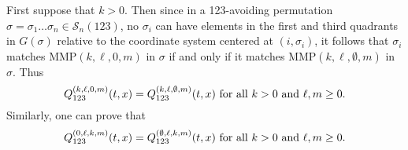 \documentclass[
final,nomarks
]{dmtcs-episciences}
\newcommand{\Sn}[1]{\mathcal{S}_{#1}}
\newcommand{\Qm}[1]{Q_{123}^{(#1)}(t,x)}
\newcommand{\MMP}{\mathrm{MMP}}
\begin{document}
First suppose that \begin{math}k >0\end{math}.  Then since in a 123-avoiding permutation 
\begin{math}\sigma = \sigma_1 \ldots \sigma_n \in \Sn{n}(123)\end{math}, no \begin{math}\sigma_i\end{math} can have elements 
in the first and third quadrants in \begin{math}G(\sigma)\end{math} relative to the coordinate system 
centered at \begin{math}(i,\sigma_i)\end{math}, it follows that \begin{math}\sigma_i\end{math} matches 
\begin{math}\MMP(k,\ell,0,m)\end{math} in \begin{math}\sigma\end{math} if and only if it matches \begin{math}\MMP(k,\ell,\emptyset,m)\end{math} in \begin{math}\sigma\end{math}. 
Thus 
\begin{equation}
\Qm{k,\ell,0,m}=\Qm{k,\ell,\emptyset,m} \ \mbox{for all \begin{math}k > 0\end{math} and \begin{math}\ell,m \geq 0\end{math}.}
\end{equation}
Similarly, one can prove that 
\begin{equation}
\Qm{0,\ell,k,m}=\Qm{\emptyset,\ell,k,m} \ \mbox{for all \begin{math}k > 0\end{math} and \begin{math}\ell,m \geq 0\end{math}.}
\end{equation}
\end{document}
